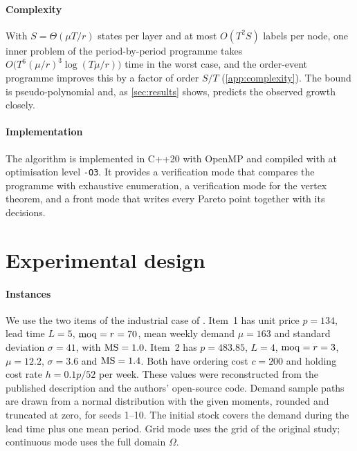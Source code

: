 \documentclass[preprint,12pt,authoryear]{elsarticle}
\begin{document}
\paragraph{Complexity}
With $S=\Theta(\mu T/r)$ states per layer and at most $O(T^2S)$ labels per node, one inner
problem of the period-by-period programme takes $O\bigl(T^{6}(\mu/r)^{3}\log(T\mu/r)\bigr)$
time in the worst case, and the order-event programme improves this by a factor of order
$S/T$ (\cref{app:complexity}). The bound is pseudo-polynomial and, as \cref{sec:results} shows,
predicts the observed growth closely.

\paragraph{Implementation}
The algorithm is implemented in C++20 with OpenMP and compiled with \verGcc{} at
optimisation level \texttt{-O3}. It provides a verification mode that compares the
programme with exhaustive enumeration, a verification mode for the vertex theorem, and a
front mode that writes every Pareto point together with its decisions.

\section{Experimental design}\label{sec:design}

\paragraph{Instances}
We use the two items of the industrial case of \citet{Kania2022CIE}. Item~1 has unit
price $p=134$, lead time $L=5$, $\mathrm{moq}=r=70$, mean weekly demand $\mu=163$ and standard
deviation $\sigma=41$, with $\mathrm{MS}=1.0$. Item~2 has $p=483.85$, $L=4$, $\mathrm{moq}=r=3$,
$\mu=12.2$, $\sigma=3.6$ and $\mathrm{MS}=1.4$. Both have ordering cost $c=200$ and holding cost
rate $h=0.1p/52$ per week. These values were reconstructed from the published description
and the authors' open-source code. Demand sample paths are drawn from a normal
distribution with the given moments, rounded and truncated at zero, for seeds 1--10. The
initial stock covers the demand during the lead time plus one mean period. Grid mode uses
the grid of the original study; continuous mode uses the full domain $\Omega$.
\end{document}
